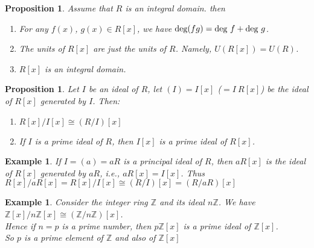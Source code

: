 \documentclass[a4paper,8pt]{article}
\newcommand{\Z}{\mathbb{Z}}
\newcommand{\degs}[1]{\textnormal{deg}#1}
\theoremstyle{theorem}
\newtheorem{proposition}[theorem]{Proposition}
\newtheorem{example}[theorem]{Example}
\begin{document}
\begin{proposition}
Assume that $R$ is an integral domain. then
\begin{enumerate}[label=(\roman*)]
\item For any $f(x)$, $g(x) \in R[x]$, we have $\degs(fg) = \degs \ f + \degs \ g$.
\item The units of $R[x]$ are just the units of $R$. Namely, $U(R[x]) = U(R)$.
\item $R[x]$ is an integral domain.
\end{enumerate}
\end{proposition}

\begin{proposition}
Let $I$ be an ideal of $R$, let $(I) = I[x]$ ($=I\ R[x]$) be the ideal of $R[x]$ generated by $I$. Then:
\begin{enumerate}[label=(\roman*)]
\item $R[x] / I[x] \cong (R/I) [x]$
\item If $I$ is a prime ideal of $R$, then $I[x]$ is a prime ideal of $R[x]$.
\end{enumerate}
\end{proposition}

\begin{example}
If $I=(a)=aR$ is a principal ideal of $R$, then $aR[x]$ is the ideal of $R[x]$ generated by $aR$, i.e., $aR[x] = I[x]$. Thus $R[x]/aR[x]=R[x]/I[x] \cong (R/I)[x] = (R/aR) [x]$	
\end{example}

\begin{example}
Consider the integer ring $\Z$ and its ideal $n\Z$. We have $\Z[x]/n\Z[x] \cong (\Z/n\Z)[x]$.\\
Hence if $n=p$ is a prime number, then $p\Z[x]$ is a prime ideal of $\Z[x]$.\\
So $p$ is a prime element of $\Z$ and also of $\Z[x]$
\end{example}
\end{document}
